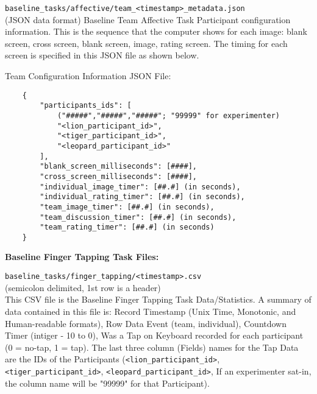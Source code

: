 \begin{description}
\medskip
\item\verb|baseline_tasks/affective/team_<timestamp>_metadata.json|\\(JSON data format)
Baseline Team Affective Task Participant configuration information. This is the sequence that the computer shows for each image: blank screen, cross screen, blank screen, image, rating screen. The timing for each screen is specified in this JSON file as shown below.

Team Configuration Information JSON File:
\begin{verbatim}
    {
        "participants_ids": [
            ("#####","#####","#####"; "99999" for experimenter)
            "<lion_participant_id>",
            "<tiger_participant_id>",
            "<leopard_participant_id>"
        ],
        "blank_screen_milliseconds": [####],
        "cross_screen_milliseconds": [####],
        "individual_image_timer": [##.#] (in seconds),
        "individual_rating_timer": [##.#] (in seconds),
        "team_image_timer": [##.#] (in seconds),
        "team_discussion_timer": [##.#] (in seconds),
        "team_rating_timer": [##.#] (in seconds)
    }
\end{verbatim}



\bigskip\item\textbf{Baseline Finger Tapping Task Files:}
\medskip
\item\verb|baseline_tasks/finger_tapping/<timestamp>.csv|\\(semicolon delimited, 1st row is a header)\\
This CSV file is the Baseline Finger Tapping Task Data/Statistics. A summary of data contained in this file is: Record Timestamp (Unix Time, Monotonic, and Human-readable formats), Row Data Event (team, individual), Countdown Timer (intiger - 10 to 0), Was a Tap on Keyboard recorded for each participant (0 = no-tap, 1 = tap). The last three column (Fields) names for the Tap Data are the IDs of the Participants (\verb|<lion_participant_id>|, \verb|<tiger_participant_id>|, \verb|<leopard_participant_id>|, If an experimenter sat-in, the column name will be "99999" for that Participant).


\end{description}
